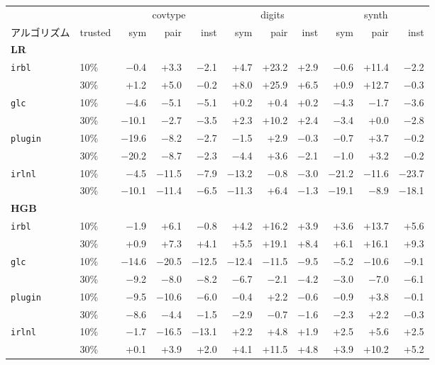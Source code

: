 \begin{tabular}{llrrrrrrrrr}
\toprule
 & & \multicolumn{3}{c}{covtype} & \multicolumn{3}{c}{digits} & \multicolumn{3}{c}{synth} \\
\cmidrule(lr){3-5} \cmidrule(lr){6-8} \cmidrule(lr){9-11}
アルゴリズム & trusted & sym & pair & inst & sym & pair & inst & sym & pair & inst \\
\midrule
\multicolumn{11}{l}{\textbf{LR}} \\
\texttt{irbl} & 10\% & $-$0.4 & +3.3 & $-$2.1 & +4.7 & +23.2 & +2.9 & $-$0.6 & +11.4 & $-$2.2 \\
 & 30\% & +1.2 & +5.0 & $-$0.2 & +8.0 & +25.9 & +6.5 & +0.9 & +12.7 & $-$0.3 \\
\texttt{glc} & 10\% & $-$4.6 & $-$5.1 & $-$5.1 & +0.2 & +0.4 & +0.2 & $-$4.3 & $-$1.7 & $-$3.6 \\
 & 30\% & $-$10.1 & $-$2.7 & $-$3.5 & +2.3 & +10.2 & +2.4 & $-$3.4 & +0.0 & $-$2.8 \\
\texttt{plugin} & 10\% & $-$19.6 & $-$8.2 & $-$2.7 & $-$1.5 & +2.9 & $-$0.3 & $-$0.7 & +3.7 & $-$0.2 \\
 & 30\% & $-$20.2 & $-$8.7 & $-$2.3 & $-$4.4 & +3.6 & $-$2.1 & $-$1.0 & +3.2 & $-$0.2 \\
\texttt{irlnl} & 10\% & $-$4.5 & $-$11.5 & $-$7.9 & $-$13.2 & $-$0.8 & $-$3.0 & $-$21.2 & $-$11.6 & $-$23.7 \\
 & 30\% & $-$10.1 & $-$11.4 & $-$6.5 & $-$11.3 & +6.4 & $-$1.3 & $-$19.1 & $-$8.9 & $-$18.1 \\
\midrule\multicolumn{11}{l}{\textbf{HGB}} \\
\texttt{irbl} & 10\% & $-$1.9 & +6.1 & $-$0.8 & +4.2 & +16.2 & +3.9 & +3.6 & +13.7 & +5.6 \\
 & 30\% & +0.9 & +7.3 & +4.1 & +5.5 & +19.1 & +8.4 & +6.1 & +16.1 & +9.3 \\
\texttt{glc} & 10\% & $-$14.6 & $-$20.5 & $-$12.5 & $-$12.4 & $-$11.5 & $-$9.5 & $-$5.2 & $-$10.6 & $-$9.1 \\
 & 30\% & $-$9.2 & $-$8.0 & $-$8.2 & $-$6.7 & $-$2.1 & $-$4.2 & $-$3.0 & $-$7.0 & $-$6.1 \\
\texttt{plugin} & 10\% & $-$9.5 & $-$10.6 & $-$6.0 & $-$0.4 & +2.2 & $-$0.6 & $-$0.9 & +3.8 & $-$0.1 \\
 & 30\% & $-$8.6 & $-$4.4 & $-$1.5 & $-$2.9 & $-$0.7 & $-$1.6 & $-$2.3 & +2.2 & $-$0.3 \\
\texttt{irlnl} & 10\% & $-$1.7 & $-$16.5 & $-$13.1 & +2.2 & +4.8 & +1.9 & +2.5 & +5.6 & +2.5 \\
 & 30\% & +0.1 & +3.9 & +2.0 & +4.1 & +11.5 & +4.8 & +3.9 & +10.2 & +5.2 \\
\bottomrule
\end{tabular}
